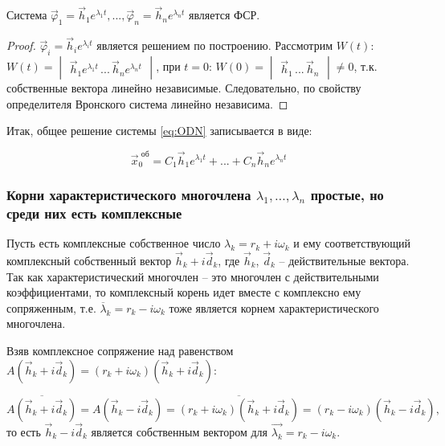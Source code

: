 \begin{lemma}
    Система $\overrightarrow{\varphi}_1 = \overrightarrow{h}_1 e^{\lambda_1 t}, ..., \overrightarrow{\varphi}_n = \overrightarrow{h}_n e^{\lambda_n t}$ является ФСР. 
\end{lemma}

\begin{proof}
    $\overrightarrow{\varphi}_i = \overrightarrow{h}_i e^{\lambda_i t}$ является решением по построению. Рассмотрим $W(t)$: $W(t) = \begin{vmatrix*} \overrightarrow{h}_1 e^{\lambda_1 t} \,...\, \overrightarrow{h}_n e^{\lambda_n t}\end{vmatrix*}$, 
    при $t = 0$: $W(0) = \begin{vmatrix*} \overrightarrow{h}_1 \, ... \, \overrightarrow{h}_n \end{vmatrix*} \neq 0$, т.к. собственные вектора линейно независимые. 
    Следовательно, по свойству определителя Вронского система линейно независима.
\end{proof}

Итак, общее решение системы \eqref{eq:ODN} записывается в виде: 

\begin{equation*}
    \boxed{\overrightarrow{x}^{\text{ об}}_0 = C_1 \overrightarrow{h}_1 e^{\lambda_1 t} + ... + C_n \overrightarrow{h}_n e^{\lambda_n t}}
\end{equation*}

\subsubsection*{Корни характеристического многочлена $\lambda_1, \dots, \lambda_n$ простые, но среди них есть комплексные}

Пусть есть комплексные собственное число $\lambda_k = r_k + i \omega_k$ и ему соответствующий комплексный собственный вектор $\overrightarrow{h}_k + i \overrightarrow{d}_k $, 
где $\overrightarrow{h}_k$, $\overrightarrow{d}_k$ -- действительные вектора. Так как характеристический многочлен -- это многочлен с действительными коэффициентами, 
то комплексный корень идет вместе с комплексно ему сопряженным, т.е. $\overline{\lambda}_k = r_k - i \omega_k$ тоже является корнем характеристического многочлена. 

Взяв комплексное сопряжение над равенством $A (\overrightarrow{h}_k + i \overrightarrow{d}_k) = (r_k + i \omega_k)(\overrightarrow{h}_k + i \overrightarrow{d}_k)$:

\[ \overline{A (\overrightarrow{h}_k + i \overrightarrow{d}_k)} = A (\overrightarrow{h}_k - i \overrightarrow{d}_k) = \overline{(r_k + i \omega_k)(\overrightarrow{h}_k + i \overrightarrow{d}_k)} = (r_k - i \omega_k)(\overrightarrow{h}_k - i \overrightarrow{d}_k), \]
то есть $\overrightarrow{h}_k - i \overrightarrow{d}_k$ является собственным вектором для $\overrightarrow{\lambda_k} = r_k - i \omega_k$.


